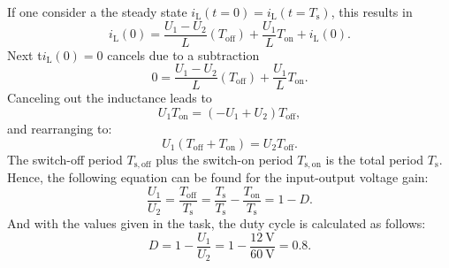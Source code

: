 \begin{solutionblock}
\begin{equation}
    \end{equation}
    If one consider a the steady state $i_{\mathrm{L}}(t=0)=i_{\mathrm{L}}(t=T_{\mathrm{s}})$, this results in
    \begin{equation}
        i_{\mathrm{L}}(0) = \frac{U_{\mathrm{1}}-U_{\mathrm{2}} }{L} (T_{\mathrm{off}})+\frac{U_{\mathrm{1}}}{L}T_{\mathrm{on}}+i_{\mathrm{L}}(0).
    \end{equation}
    Next t$i_{\mathrm{L}}(0)=0$ cancels due to a subtraction
    \begin{equation}
        0 = \frac{U_{\mathrm{1}}-U_{\mathrm{2}} }{L} (T_{\mathrm{off}})+\frac{U_{\mathrm{1}}}{L}T_{\mathrm{on}}.
    \end{equation}
    Canceling out the inductance leads to
    \begin{equation}
        U_{\mathrm{1}}T_{\mathrm{on}}= (-U_{\mathrm{1}}+U_{\mathrm{2}})T_{\mathrm{off}},
    \end{equation}
    and rearranging to:
    \begin{equation}
        U_{\mathrm{1}}(T_{\mathrm{off}}+T_{\mathrm{on}})=  U_{\mathrm{2}}T_{\mathrm{off}}.
    \end{equation}
    The switch-off period $T_{\mathrm{s,off}}$ plus the switch-on period $T_{\mathrm{s,on}}$ is the total period $T_{\mathrm{s}}$. Hence, the following equation can be found for the input-output voltage gain:
    \begin{equation}
        \frac{U_{\mathrm{1}}}{U_{\mathrm{2}}}= \frac{T_{\mathrm{off}}}{T_{\mathrm{s}}}= \frac{T_{\mathrm{s}}}{T_{\mathrm{s}}}-\frac{T_{\mathrm{on}}}{T_{\mathrm{s}}} = 1-D.
    \end{equation}
    And with the values given in the task, the duty cycle is calculated as follows:
    \begin{equation}
        D = 1-\frac{U_{\mathrm{1}}}{U_{\mathrm{2}}} = 1- \frac {\SI{12}{\volt}} {\SI{60}{\volt}} = 0.8.
    \end{equation}
\end{solutionblock}


